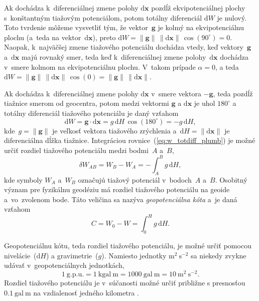 \documentclass[a4paper,12pt]{book}
\newcommand{\diff}{\mathrm d}
\let\vec\mathbf
\begin{document}
Ak dochádza k~diferenciálnej zmene polohy $\diff \vec x$ pozdĺž 
ekvipotenciálnej plochy s~konštantným tiažovým potenciálom, potom totálny 
diferenciál $\diff W$ je nulový.  Toto tvrdenie môžeme vysvetliť tým, že 
vektor~$\vec g$ je kolmý na ekvipotenciálnu plochu (a~teda na vektor~$\diff 
\vec x$), preto $\diff W = \| \vec g \| \, \| \diff \vec x \| \, 
\cos(90^{\circ}) = 0$.  Naopak, k~najväčšej zmene tiažového potenciálu dochádza 
vtedy, keď vektory~$\vec g$ a~$\diff \vec x$ majú rovnaký smer, teda keď 
k~diferenciálnej zmene polohy~$\diff \vec x$ dochádza v~smere kolmom na 
ekvipotenciálnu plochu.  V~takom prípade $\alpha = 0$, a teda $\diff W = \| 
\vec g \| \, \| \diff \vec x \| \, \cos(0) = \| \vec g \| \, \| \diff \vec 
x \|$.

Ak dochádza k~diferenciálnej zmene polohy $\diff \vec x$ v~smere vektora $-\vec 
g$, teda pozdĺž tiažnice smerom od geocentra, potom medzi vektormi $\vec g$ 
a $\diff \vec x$ je uhol $180^{\circ}$ a totálny diferenciál tiažového 
potenciálu je daný vzťahom
%
\begin{equation}
\label{eq:w_totdiff_plumb}
\diff W = \vec g \cdot \diff \vec x = g \, \diff H \, \cos(180^{\circ}) = -g \, 
\diff H{,}
\end{equation}
%
kde~$g = \| \vec g \|$ je veľkosť vektora tiažového zrýchlenia a~$\diff H = \| 
\diff \vec x \|$ je diferenciálna dĺžka tiažnice.  Integráciou 
rovnice~(\ref{eq:w_totdiff_plumb}) je možné určiť rozdiel tiažového potenciálu 
medzi bodmi~$A$ a~$B$,
%
\begin{equation}
\label{eq:w_ab}
\delta W_{AB} = W_B - W_A = -\int_{A}^{B} g \, \diff H{,}
\end{equation}
%
kde symboly $W_A$ a~$W_B$ označujú tiažový potenciál v~bodoch~$A$ a~$B$.  
Osobitný význam pre fyzikálnu geodéziu má rozdiel tiažového potenciálu na 
geoide a~vo~zvolenom bode.  Táto veličina sa nazýva \emph{geopotenciálna kóta} 
a~je daná vzťahom
%
\begin{equation}
\label{eq:geopotential_number}
C = W_0 - W = \int_0^H g \, \diff H{.}
\end{equation}

Geopotenciálnu kótu, teda rozdiel tiažového potenciálu, je možné určiť pomocou 
nivelácie~($\diff H$) a gravimetrie~($g$).  Namiesto jednotky $\mathrm{m}^2\ 
\mathrm{s}^{-2}$ sa niekedy zvykne udávať v~geopotenciálnych jednotkách,
%
\begin{equation}
\label{eq:gpu_unit}
1\ \mathrm{g.p.u.} = 1\ \mathrm{kgal} \ \mathrm{m} = 1000\ \mathrm{gal}\ 
\mathrm{m} = 10\ \mathrm{m}^2 \ \mathrm{s}^{-2}{.}
\end{equation}
%
Rozdiel tiažového potenciálu je v~súčanosti možné určiť približne s presnosťou 
$0.1\ \mathrm{gal} \ \mathrm{m}$ na vzdialenosť jedného kilometra 
\parencite{MoritzPhysicalGeodesy}.
\end{document}

